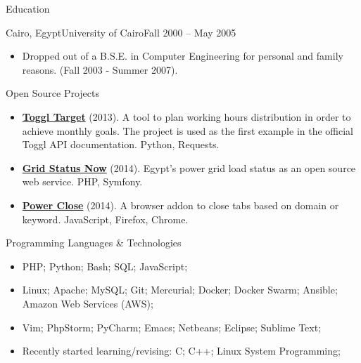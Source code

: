 \documentclass[]{mosabcv}
\begin{document}
    \begin{cvsection}{Education}
        \begin{cvsubsection}{Cairo, Egypt}{University of Cairo}{Fall 2000 -- May 2005}
            \begin{itemize}
                \item Dropped out of a B.S.E. in Computer Engineering for personal and family reasons. (Fall 2003 - Summer 2007).
            \end{itemize}
        \end{cvsubsection}
    \end{cvsection}

    \begin{cvsection}{Open Source Projects}
        \begin{cvsubsection}{}{}{}
            \begin{itemize}
                \item \textbf{\href{https://github.com/mos3abof/toggl_target}{Toggl Target}} (2013). A tool to plan working hours distribution in order to achieve monthly goals. The project is used as the first example in the official Toggl API documentation. Python, Requests.
                \item \textbf{\href{https://www.gridstatusnow.com}{Grid Status Now}} (2014). Egypt's power grid load status as an open source web service. PHP, Symfony.
                \item \textbf{\href{https://power-close.com/}{Power Close}} (2014). A browser addon to close tabs based on domain or keyword. JavaScript, Firefox, Chrome.
            \end{itemize}
        \end{cvsubsection}
    \end{cvsection}

    \begin{cvsection}{Programming Languages \& Technologies}
        \begin{cvsubsection}{}{}{}
            \begin{itemize}
                \item PHP; Python; Bash; SQL; JavaScript;
                \item Linux; Apache; MySQL; Git; Mercurial; Docker; Docker Swarm; Ansible; Amazon Web Services (AWS);
                \item Vim; PhpStorm; PyCharm; Emacs; Netbeans; Eclipse; Sublime Text;
                \item Recently started learning/revising: C; C++; Linux System Programming;
            \end{itemize}
        \end{cvsubsection}
    \end{cvsection}
\end{document}
